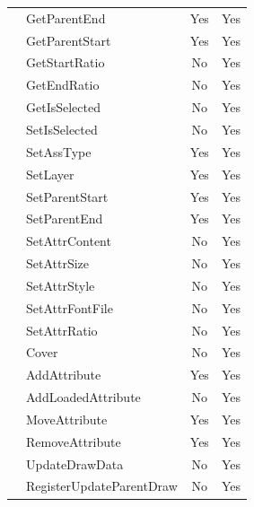 \documentclass[12pt]{article}
\begin{document}
\begin{longtable}{|l|l|c|c|}
        & GetParentEnd                   & Yes             & Yes           \\
        & GetParentStart                 & Yes             & Yes           \\
        & GetStartRatio                  & No              & Yes           \\
        & GetEndRatio                    & No              & Yes           \\
        & GetIsSelected                  & No              & Yes           \\
        & SetIsSelected                  & No              & Yes           \\
        & SetAssType                     & Yes             & Yes           \\
        & SetLayer                       & Yes             & Yes           \\
        & SetParentStart                 & Yes             & Yes           \\
        & SetParentEnd                   & Yes             & Yes           \\
        & SetAttrContent                 & No              & Yes           \\
        & SetAttrSize                    & No              & Yes           \\
        & SetAttrStyle                   & No              & Yes           \\
        & SetAttrFontFile                & No              & Yes           \\
        & SetAttrRatio                   & No              & Yes           \\
        & Cover                          & No              & Yes           \\
        & AddAttribute                   & Yes             & Yes           \\
        & AddLoadedAttribute             & No              & Yes           \\
        & MoveAttribute                  & Yes             & Yes           \\
        & RemoveAttribute                & Yes             & Yes           \\
        & UpdateDrawData                 & No              & Yes           \\
        & RegisterUpdateParentDraw       & No              & Yes           \\
        \hline

\end{longtable}
\end{document}
